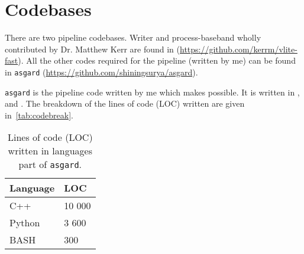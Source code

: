 \section{Codebases}

\par There are two pipeline codebases. Writer and process-baseband wholly contributed by Dr. Matthew Kerr are found in  (\url{https://github.com/kerrm/vlite-fast}).
All the other codes required for the pipeline (written by me) can be found in \texttt{asgard} (\url{https://github.com/shiningsurya/asgard}).

\par \texttt{asgard} is the pipeline code written by me which makes \vf possible. It is written in ,  and . The breakdown of the lines of code (LOC) written are given in~\autoref{tab:codebreak}.

\begin{table}[]
	\label{tab:codebreak}
	\begin{tabular}{@{}ll@{}}
		\toprule
		Language & LOC \\ \midrule
		C++ & 10 000 \\
		Python & 3 600 \\
		BASH & 300 \\ \bottomrule
	\end{tabular}
	\caption{Lines of code (LOC) written in languages part of \texttt{asgard}.}
\end{table}
